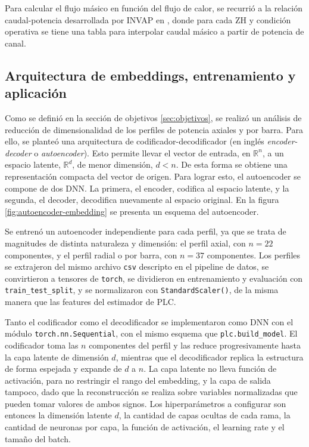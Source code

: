 Para calcular el flujo másico en función del flujo de calor, se recurrió a la relación caudal-potencia desarrollada por INVAP en \citep{invap_caudal_potencia}, donde para cada ZH y condición operativa se tiene una tabla para interpolar caudal másico a partir de potencia de canal.



\subsection{Arquitectura de embeddings, entrenamiento y aplicación}
\label{sec:arq_embeddings}
Como se definió en la sección de objetivos \ref{sec:objetivos}, se realizó un análisis de reducción de dimensionalidad de los perfiles de potencia axiales y por barra. Para ello, se planteó una arquitectura de codificador-decodificador (en inglés \textit{encoder-decoder} o \textit{autoencoder}). Esto permite llevar el vector de entrada, en $\mathbb{R}^n$, a un espacio latente, $\mathbb{R}^d$, de menor dimensión, $d<n$. De esta forma se obtiene una representación compacta del vector de origen.
Para lograr esto, el autoencoder se compone de dos DNN. La primera, el encoder, codifica al espacio latente, y la segunda, el decoder, decodifica nuevamente al espacio original. En la figura \ref{fig:autoencoder-embedding} se presenta un esquema del autoencoder.



Se entrenó un autoencoder independiente para cada perfil, ya que se trata de magnitudes de distinta naturaleza y dimensión: el perfil axial, con $n=22$ componentes, y el perfil radial o por barra, con $n=37$ componentes. Los perfiles se extrajeron del mismo archivo \texttt{csv} descripto en el pipeline de datos, se convirtieron a tensores de \texttt{torch}, se dividieron en entrenamiento y evaluación con \texttt{train\_test\_split}, y se normalizaron con \texttt{StandardScaler()}, de la misma manera que las features del estimador de PLC.

Tanto el codificador como el decodificador se implementaron como DNN con el módulo \texttt{torch.nn.Sequential}, con el mismo esquema que \texttt{plc.build\allowbreak\_model}. El codificador toma las $n$ componentes del perfil y las reduce progresivamente hasta la capa latente de dimensión $d$, mientras que el decodificador replica la estructura de forma espejada y expande de $d$ a $n$. La capa latente no lleva función de activación, para no restringir el rango del embedding, y la capa de salida tampoco, dado que la reconstrucción se realiza sobre variables normalizadas que pueden tomar valores de ambos signos. Los hiperparámetros a configurar son entonces la dimensión latente $d$, la cantidad de capas ocultas de cada rama, la cantidad de neuronas por capa, la función de activación, el learning rate y el tamaño del batch.

